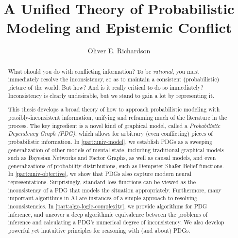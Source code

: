 \documentclass[tocprelim,
    ]{cornellmodified}
\title {%
    A Unified Theory of Probabilistic Modeling and Epistemic Conflict
}
\author {Oliver E. Richardson}
\begin{document}
\maketitle
\makecopyright

\begin{abstract}
%

What should you do with conflicting information?
To be \emph{rational}, you must immediately resolve the inconsistency,
    so as to maintain a consistent (probabilistic) picture of the world.
%
But how?
And is it really critical to do so immediately?
Inconsistency is clearly undesirable, but we stand to gain a lot by representing it.
%

This thesis develops a broad theory of how to approach probabilistic modeling with possibly-inconsistent information, unifying and reframing much of the literature in the process.  
The key ingredient is a novel kind of graphical model, called a \emph{Probabilistic Dependency Graph (PDG)},
which allows for arbitrary (even conflicting) pieces of probabilistic information. 
In \cref{part:univ-model}, we establish PDGs as a sweeping generalization of other models of mental state, including traditional graphical models such as Bayesian Networks and Factor Graphs, as well as causal models, and even generalizations of probability distributions, such as Dempster-Shafer Belief functions. 
In \cref{part:univ-objective}, we show that PDGs also capture modern neural representations.
Surprisingly, standard loss functions can be viewed as the inconsistency of a PDG that models the situation appropriately. 
Furthermore, many important algorithms in AI are instances of a simple approach to resolving inconsistencies. 
In \cref{part:algo-logic-complexity}, we provide algorithms for PDG inference, and uncover a deep algorithmic equivalence between the problems of inference and calculating a PDG's numerical degree of inconsistency. 
We also develop powerful yet inutuitive principles for reasoning with (and about) PDGs. 
\end{abstract}
\end{document}
